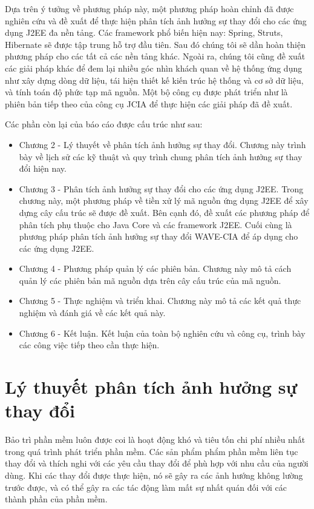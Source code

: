 \documentclass[12pt]{report}
\begin{document}
Dựa trên ý tưởng về phương pháp này, một phương pháp hoàn chỉnh đã được nghiên
cứu và đề xuất để thực hiện phân tích ảnh hưởng sự thay đổi cho các ứng dụng J2EE đa
nền tảng. Các framework phổ biến hiện nay: Spring, Struts, Hibernate sẽ được tập trung
hỗ trợ đầu tiên. Sau đó chúng tôi sẽ dần hoàn thiện phương pháp cho các tất cả các nền
tảng khác. Ngoài ra, chúng tôi cũng đề xuất các giải pháp khác để đem lại nhiều góc nhìn
khách quan về hệ thống ứng dụng như xây dựng dòng dữ liệu, tái hiện thiết kế kiến trúc
hệ thống và cơ sở dữ liệu, và tính toán độ phức tạp mã nguồn. Một bộ công cụ được phát
triển như là phiên bản tiếp theo của công cụ JCIA để thực hiện các giải pháp đã đề xuất.

Các phần còn lại của báo cáo được cấu trúc như sau:
\begin{itemize}
\item Chương 2 - Lý thuyết về phân tích ảnh hưởng sự thay đổi. Chương này trình bày về lịch sử các kỹ thuật và quy trình chung phân tích ảnh hưởng sự thay đổi hiện nay.
\item Chương 3 - Phân tích ảnh hưởng sự thay đổi cho các ứng dụng J2EE. Trong chương này, một phương pháp về tiền xử lý mã nguồn ứng dụng J2EE để xây dựng cây cấu trúc sẽ được đề xuất. Bên cạnh đó, đề xuất các phương pháp để phân tích phụ thuộc cho Java Core và các framework J2EE. Cuối cùng là phương pháp phân tích ảnh hưởng sự thay đổi WAVE-CIA để áp dụng cho các ứng dụng J2EE.
\item Chương 4 - Phương pháp quản lý các phiên bản. Chương này mô tả cách quản lý các phiên bản mã nguồn dựa trên cây cấu trúc của mã nguồn.
\item Chương 5 - Thực nghiệm và triển khai. Chương này mô tả các kết quả thực nghiệm và đánh giá về các kết quả này.
\item Chương 6 - Kết luận. Kết luận của toàn bộ nghiên cứu và công cụ, trình bày các công việc tiếp theo cần thực hiện.
\end{itemize}


\newpage	
\chapter{Lý thuyết phân tích ảnh hưởng sự thay đổi}
Bảo trì phần mềm luôn được coi là hoạt động khó và tiêu tốn chi phí nhiều nhất trong quá trình phát triển phần mềm. Các sản phẩm phẩm phần mềm liên tục thay đổi và thích nghi với các yêu cầu thay đổi để phù hợp với nhu cầu của người dùng. Khi các thay đổi được thực hiện, nó sẽ gây ra các ảnh hướng không lường trước được, và có thể gây ra các tác động làm mất sự nhất quán đối với các thành phần của phần mềm.
\end{document}

